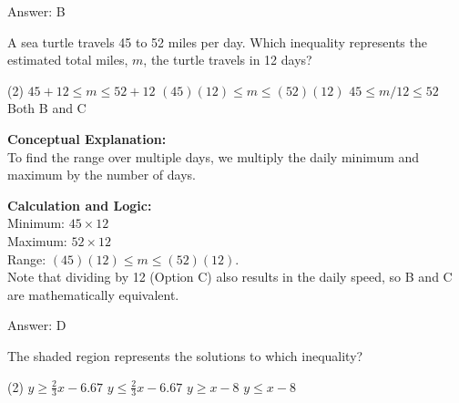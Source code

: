 \documentclass[11pt,paper=a4,answers]{exam}
\begin{document}
\begin{questions}
\begin{solution}
\vspace{15pt}
Answer: \colorbox{yellow!100}{B}
\end{solution}

\question
A sea turtle travels 45 to 52 miles per day. Which inequality represents the estimated total miles, $m$, the turtle travels in 12 days?
\begin{tasks}(2)
    \task $45 + 12 \le m \le 52 + 12$
    \task $(45)(12) \le m \le (52)(12)$
    \task $45 \le m/12 \le 52$
    \task Both B and C
\end{tasks}

\begin{solution}
\textbf{Conceptual Explanation:} \\
To find the range over multiple days, we multiply the daily minimum and maximum by the number of days.

\vspace{10pt}
\textbf{Calculation and Logic:} \\
Minimum: $45 \times 12$ \\
Maximum: $52 \times 12$ \\
Range: $(45)(12) \le m \le (52)(12)$. \\
Note that dividing by 12 (Option C) also results in the daily speed, so B and C are mathematically equivalent.

\vspace{15pt}
Answer: \colorbox{yellow!100}{D}
\end{solution}

\question
The shaded region represents the solutions to which inequality?

\begin{center}
\end{center}

\begin{tasks}(2)
    \task $y \ge \frac{2}{3}x - 6.67$
    \task $y \le \frac{2}{3}x - 6.67$
    \task $y \ge x - 8$
    \task $y \le x - 8$
\end{tasks}


\end{questions}
\end{document}

